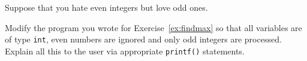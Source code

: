 Suppose that you hate even integers but love odd ones.

\begin{exercise}
Modify the program you wrote for Exercise~\ref{ex:findmax} so that all variables
are of type \verb^int^, even numbers are ignored and only odd integers are processed.
Explain all this to the user via appropriate \verb^printf()^ statements.
\end{exercise}
